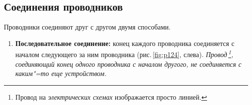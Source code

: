 \documentclass[main.tex]{subfiles}
\begin{document}

\pagestyle{empty}

\begin{NoHyper} %

\setcounter{section}{20
}
\addtocounter{section}{-1} 

\section{Соединения проводников}


Проводники соединяют друг с другом двумя способами. 
\begin{enumerate}
    \item \textbf{Последовательное соединение:} конец каждого проводника соединяется с началом следующего за ним проводника (рис.\,\ref{fig:p124}, слева). \emph{Провод\,\footnote{Провод на \emph{электрических схемах} изображается просто линией.}, соединяющий конец одного проводника с началом другого, не соединяется с каким"=то еще устройством.}
    




    



\end{enumerate}
\end{NoHyper}
\end{document}
